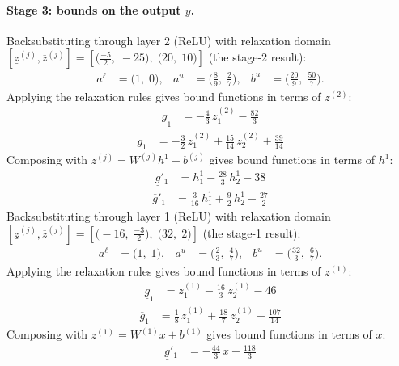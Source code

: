 \documentclass[11pt]{article}
\begin{document}
\paragraph{Stage 3: bounds on the output $y$.}
Backsubstituting through layer 2 (ReLU) with relaxation domain $[\underline{z}^{(j)}, \overline{z}^{(j)}] = [\bigl(\frac{-5}{2},\; -25\bigr),\; \bigl(20,\; 10\bigr)]$ (the stage-2 result):
\begin{align*}
a^{\ell} &= \bigl(1,\; 0\bigr), & a^{u} &= \bigl(\frac{8}{9},\; \frac{2}{7}\bigr), & b^{u} &= \bigl(\frac{20}{9},\; \frac{50}{7}\bigr).
\end{align*}
Applying the relaxation rules gives bound functions in terms of $z^{(2)}$:
\begin{align*}
\underline{g}_{1} &= -\frac{4}{3}\,z^{(2)}_{1} - \frac{82}{3}
\end{align*}
\begin{align*}
\overline{g}_{1} &= -\frac{3}{2}\,z^{(2)}_{1} + \frac{15}{14}\,z^{(2)}_{2} + \frac{39}{14}
\end{align*}
Composing with $z^{(j)} = W^{(j)} h^{1} + b^{(j)}$ gives bound functions in terms of $h^{1}$:
\begin{align*}
\underline{g}'_{1} &= h^{1}_{1} - \frac{28}{3}\,h^{1}_{2} - 38
\end{align*}
\begin{align*}
\overline{g}'_{1} &= \frac{3}{16}\,h^{1}_{1} + \frac{9}{2}\,h^{1}_{2} - \frac{27}{2}
\end{align*}
Backsubstituting through layer 1 (ReLU) with relaxation domain $[\underline{z}^{(j)}, \overline{z}^{(j)}] = [\bigl(-16,\; \frac{-3}{2}\bigr),\; \bigl(32,\; 2\bigr)]$ (the stage-1 result):
\begin{align*}
a^{\ell} &= \bigl(1,\; 1\bigr), & a^{u} &= \bigl(\frac{2}{3},\; \frac{4}{7}\bigr), & b^{u} &= \bigl(\frac{32}{3},\; \frac{6}{7}\bigr).
\end{align*}
Applying the relaxation rules gives bound functions in terms of $z^{(1)}$:
\begin{align*}
\underline{g}_{1} &= z^{(1)}_{1} - \frac{16}{3}\,z^{(1)}_{2} - 46
\end{align*}
\begin{align*}
\overline{g}_{1} &= \frac{1}{8}\,z^{(1)}_{1} + \frac{18}{7}\,z^{(1)}_{2} - \frac{107}{14}
\end{align*}
Composing with $z^{(1)} = W^{(1)} x + b^{(1)}$ gives bound functions in terms of $x$:
\begin{align*}
\underline{g}'_{1} &= -\frac{44}{3}\,x - \frac{118}{3}
\end{align*}
\end{document}
